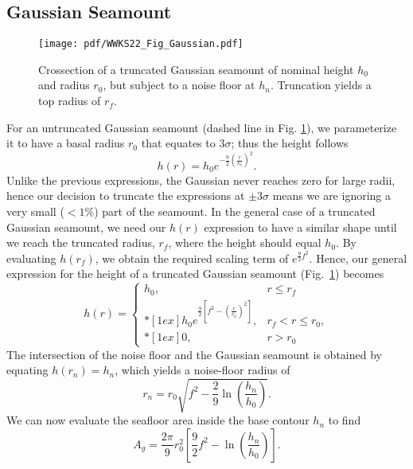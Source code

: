 \subsection{Gaussian Seamount}

\begin{figure}[h]
\centering
\texttt{[image: pdf/WWKS22\_Fig\_Gaussian.pdf]}
\caption{Crossection of a truncated Gaussian seamount of nominal height $h_0$ and radius
$r_0$, but subject to a noise floor at $h_n$.  Truncation yields a top radius of $r_f$.}
\label{WWKS22_Fig_Gaussian}
\end{figure}

For an untruncated Gaussian seamount (dashed line in Fig. \ref{WWKS22_Fig_Gaussian}), we parameterize it to have
a basal radius $r_0$ that equates to $3\sigma$; thus the height follows
\begin{equation*}
h(r) = h_0 e^{-\frac{9}{2} \left (\frac{r}{r_0} \right)^2}.
\end{equation*}
Unlike the previous expressions, the Gaussian never reaches zero for large radii, hence our decision to
truncate the expressions at $\pm3\sigma$ means we are ignoring a very small ($<1$\%) part of the seamount.
In the general case of a truncated Gaussian seamount, we need our $h(r)$ expression to have a similar
shape until we reach the truncated radius, $r_f$, where the height should equal $h_0$.
By evaluating $h(r_f)$, we obtain the required scaling term of $e^{\frac{9}{2}f^2}$.
Hence, our general expression for the height of a truncated Gaussian seamount (Fig.~\ref{WWKS22_Fig_Gaussian}) becomes
\begin{equation*}
h(r) = \left \{ \begin{array}{cl}
	h_0, &	r \leq r_f \\*[1ex]
	\displaystyle h_0 e^{\frac{9}{2} \left [ f^2 - \left (\frac{r}{r_0} \right )^2 \right ]}, & r_f < r \leq r_0, \\*[1ex]
	0, & r > r_0
\end{array} \right.
\end{equation*}
The intersection of the noise floor and the Gaussian seamount is obtained by equating $h(r_n) = h_n$,
which yields a noise-floor radius of
\begin{equation*}
r_n = r_0 \sqrt{f^2 - \frac{2}{9} \ln{\left (\frac{h_n}{h_0} \right )}}.
\end{equation*}
We can now evaluate the seafloor area inside the base contour $h_n$ to find
\begin{equation}
A_g = \frac{2\pi}{9} r_0^2 \left [ \frac{9}{2}f^2  - \ln{\left( \frac{h_n}{h_0} \right )} \right ].
\end{equation}

